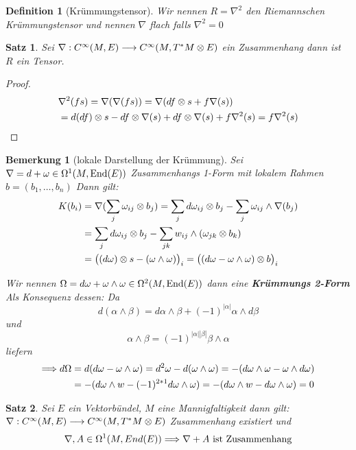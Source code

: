 \documentclass{report}
\newtheorem{Def}{Definition}[chapter]
\newtheorem{Thrm}{Satz}[chapter]
\newtheorem*{Bem}{Bemerkung}
\begin{document}
\begin{Def}[Krümmungstensor]
    Wir nennen $R = \nabla^2$ den Riemannschen Krümmungstensor und nennen $\nabla$ flach falls $\nabla^2= 0$
\end{Def}


\begin{Thrm}
    Sei $\nabla: C^\infty(M , E) \longrightarrow C^\infty( M ,T^*M \otimes E )$ ein Zusammenhang dann ist $R$ ein Tensor. 
\end{Thrm}
\begin{proof}
    \begin{align*}
        &\nabla^2(fs) = \nabla(\nabla(fs)) = \nabla(df \otimes s + f\nabla(s))\\
        &= d(df) \otimes s - df \otimes \nabla(s) + df \otimes \nabla(s) + f\nabla^2(s) = f \nabla^2(s)
    \end{align*}
\end{proof}

\begin{Bem}[lokale Darstellung der Krümmung]
    Sei \\
    $\nabla = d + \omega \in \Omega^1(M,\operatorname{End}(E))$ Zusammenhangs 1-Form mit lokalem Rahmen $b = (b_1,\ldots,b_n)$
    Dann gilt:
    \begin{align*}
        K(b_i) &= \nabla(\sum_j \omega_{ij} \otimes b_j) = \sum_{j} d\omega_{ij} \otimes b_j - \sum_j \omega_{ij} \wedge \nabla(b_j)\\
        &= \sum_j d\omega_{ij} \otimes b_j - \sum_{jk} w_{ij} \wedge (\omega_{jk} \otimes b_k)\\
        &= \big((d\omega)\otimes s - (\omega \wedge \omega)\big)_i = \big((d\omega - \omega \wedge \omega) \otimes b\big)_i
    \end{align*}

    Wir nennen $\Omega = d\omega + \omega \wedge \omega \in \Omega^2(M,\operatorname{End}(E))$ dann eine \textbf{Krümmungs 2-Form}    
    Als Konsequenz dessen:
    Da $$ d(\alpha \wedge \beta) = d\alpha \wedge \beta + (-1)^{|\alpha|}\alpha \wedge d\beta$$ und 
    $$\alpha \wedge \beta = (-1)^{|\alpha||\beta|} \beta \wedge \alpha$$ liefern
    \begin{align*}
        \Longrightarrow d\Omega &= d(d\omega - \omega \wedge \omega) = d^2\omega - d(\omega \wedge \omega) = -(d\omega \wedge \omega - \omega \wedge d\omega)\\
    &= -(d\omega \wedge w -(-1)^{2*1} d\omega \wedge \omega) = -(d\omega \wedge w - d\omega \wedge \omega) = 0 
    \end{align*} 
\end{Bem}

\begin{Thrm}
    Sei $E$ ein Vektorbündel, $M$ eine Mannigfaltigkeit dann gilt: $\nabla: C^\infty(M , E) \longrightarrow C^\infty( M ,T^*M \otimes E )$ Zusammenhang existiert und
    $$\nabla, A \in \Omega^1(M,End(E)) \Longrightarrow \nabla + A \text{ ist Zusammenhang} $$
\end{Thrm}
\end{document}

